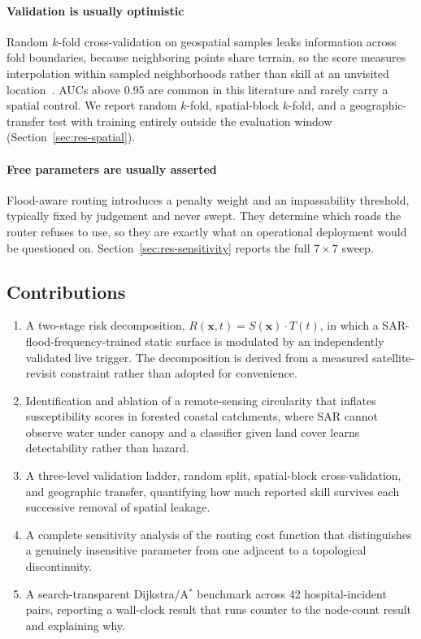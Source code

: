 \documentclass[10pt,twocolumn]{article}
\newcommand{\Sx}{S(\mathbf{x})}
\newcommand{\Tt}{T(t)}
\newcommand{\Rxt}{R(\mathbf{x},t)}
\begin{document}
\paragraph{Validation is usually optimistic}
Random $k$-fold cross-validation on geospatial samples leaks information across
fold boundaries, because neighboring points share terrain, so the score measures
interpolation within sampled neighborhoods rather than skill at an unvisited
location~\citep{roberts2017,ploton2020,meyer2021}. AUCs above 0.95 are common in
this literature and rarely carry a spatial control. We report random $k$-fold,
spatial-block $k$-fold, and a geographic-transfer test with training entirely
outside the evaluation window (Section~\ref{sec:res-spatial}).

\paragraph{Free parameters are usually asserted}
Flood-aware routing introduces a penalty weight and an impassability threshold,
typically fixed by judgement and never swept. They determine which roads the
router refuses to use, so they are exactly what an operational deployment would
be questioned on. Section~\ref{sec:res-sensitivity} reports the full
$7\times7$ sweep.

\subsection{Contributions}
\begin{enumerate}
\itemsep2pt
\item A two-stage risk decomposition, $\Rxt=\Sx\cdot\Tt$, in which a
      SAR-flood-frequency-trained static surface is modulated by an independently
      validated live trigger. The decomposition is derived from a measured
      satellite-revisit constraint rather than adopted for convenience.
\item Identification and ablation of a remote-sensing circularity that inflates
      susceptibility scores in forested coastal catchments, where SAR cannot
      observe water under canopy and a classifier given land cover learns
      detectability rather than hazard.
\item A three-level validation ladder, random split, spatial-block
      cross-validation, and geographic transfer, quantifying how much reported
      skill survives each successive removal of spatial leakage.
\item A complete sensitivity analysis of the routing cost function that
      distinguishes a genuinely insensitive parameter from one adjacent to a
      topological discontinuity.
\item A search-transparent Dijkstra/A$^\ast$ benchmark across 42
      hospital-incident pairs, reporting a wall-clock result that runs counter to
      the node-count result and explaining why.
\end{enumerate}
\end{document}
